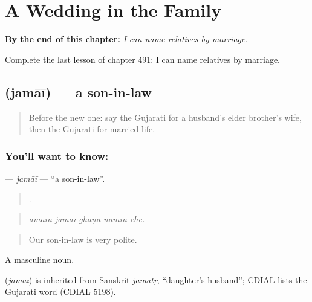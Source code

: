 
\chapter{A Wedding in the Family}
\label{ch:gu-a-wedding-in-the-family}

\begin{chapteropening}
\textbf{By the end of this chapter:} \emph{I can name relatives by marriage.}

Complete the last lesson of chapter 491: I can name relatives by marriage.
\end{chapteropening}

\section[\texorpdfstring{\gu{જમાઈ} (jamāī)}{જમાઈ (jamāī)}]{ (jamāī) — a son-in-law}

\label{lesson:GU-C491-jamai}



\begin{quote}
Before the new one: say the Gujarati for a husband's elder brother's wife, then the Gujarati for married life.
\end{quote}

\subsection*{You'll want to know: }
\textbf{} — \emph{jamāī} — \textquotedblleft{}a son-in-law\textquotedblright{}.

\begin{quote}
    .
\end{quote}

\begin{quote}
\emph{amārā jamāī ghaṇā namra che.}
\end{quote}

\begin{quote}
Our son-in-law is very polite.
\end{quote}

A masculine noun.

\begin{cousinweb}
\textbf{} (\emph{jamāī}) is inherited from Sanskrit \emph{jāmātṛ}, \textquotedblleft{}daughter's husband\textquotedblright{}; CDIAL lists the Gujarati word (CDIAL 5198).
\end{cousinweb}

